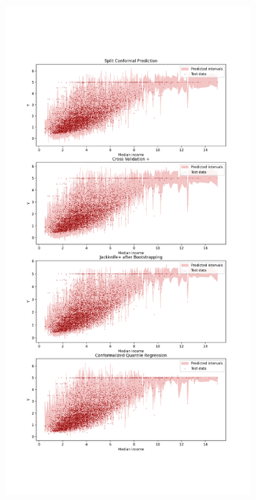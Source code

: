 \begin{figure}[ht]
    \centering
    \hspace{-10mm}
    \begin{subfigure}[b]{0.48\textwidth}
        \centering
        \includegraphics[width=1.2\textwidth, height=3.35\textwidth]{Figures/regression/prediction-intervals-regression-problem.png}

\end{subfigure}
\end{figure}
